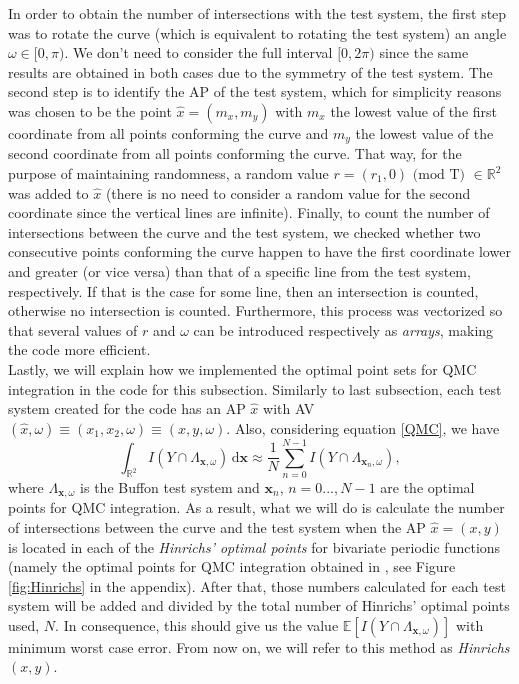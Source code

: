 In order to obtain the number of intersections with the test system, the first step was to rotate the curve (which is equivalent to rotating the test system) an angle $\omega \in [0,\pi)$. We don't need to consider the full interval $[0,2\pi)$ since the same results are obtained in both cases due to the symmetry of the test system. The second step is to identify the AP of the test system, which for simplicity reasons was chosen to be the point $\widehat{x}=(m_x,m_y)$ with $m_x$ the lowest value of the first coordinate from all points conforming the curve and $m_y$ the lowest value of the second coordinate from all points conforming the curve. That way, for the purpose of maintaining randomness, a random value $r=(r_1,0) \text{ (mod T) } \in \mathbb{R}^2$ was added to $\widehat{x}$ (there is no need to consider a random value for the second coordinate since the vertical lines are infinite). Finally, to count the number of intersections between the curve and the test system, we checked whether two consecutive points conforming the curve happen to have the first coordinate lower and greater (or vice versa) than that of a specific line from the test system, respectively. If that is the case for some line, then an intersection is counted, otherwise no intersection is counted. Furthermore, this process was vectorized so that several values of $r$ and $\omega$ can be introduced respectively as \textit{arrays}, making the code more efficient.\\


Lastly, we will explain how we implemented the optimal point sets for QMC integration in the code for this subsection. Similarly to last subsection, each test system created for the code has an AP $\widehat{x}$ with AV $(\widehat{x},\omega)\equiv(x_1,x_2,\omega)\equiv(x,y,\omega)$. Also, considering equation \eqref{QMC}, we have
\begin{equation*}
    \int_{\mathbb{R}^2} I(Y\cap \Lambda_{\textbf{x},\omega}) \,\mathrm{d}\textbf{x} \approx  \frac{1}{N} \sum_{n=0}^{N-1} I(Y\cap \Lambda_{\textbf{x}_n,\omega}),
\end{equation*}
where $\Lambda_{\textbf{x},\omega}$ is the Buffon test system and $\textbf{x}_n$, $n=0...,N-1$ are the optimal points for QMC integration. As a result, what we will do is calculate the number of intersections between the curve and the test system when the AP $\widehat{x}=(x,y)$ is located in each of the \textit{Hinrichs' optimal points} for bivariate periodic functions (namely the optimal points for QMC integration obtained in \cite{Hinrichs.pdf}, see Figure \ref{fig:Hinrichs} in the appendix). After that, those numbers calculated for each test system will be added and divided by the total number of Hinrichs' optimal points used, $N$. In consequence, this should give us the value $\mathbb{E}[I(Y\cap \Lambda_{\textbf{x},\omega})]$ with minimum worst case error. From now on, we will refer to this method as \textit{Hinrichs $(x,y)$}.\\

